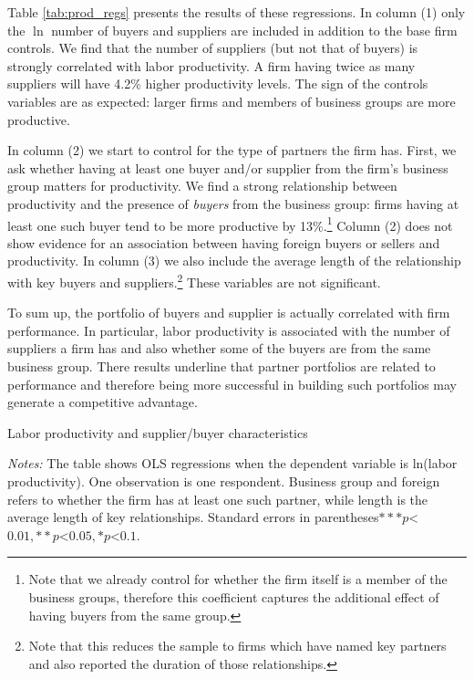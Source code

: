 \usepackage{}\documentclass[final, dvipsnames, authoryear,12pt]{elsarticle}
\begin{document}

Table \ref{tab:prod_regs} presents the results of these regressions. In column (1) only the $\ln$ number of buyers and suppliers are included in addition to the base firm controls. We find that the number of suppliers (but not that of buyers) is strongly correlated with labor productivity. A firm having twice as many suppliers will have 4.2\% higher productivity levels. The sign of the controls variables are as expected: larger firms and members of business groups are more productive.

In column (2) we start to control for the type of partners the firm has. First, we ask whether having at least one buyer and/or supplier from the firm's business group matters for productivity. We find a strong relationship between productivity and the presence of \textit{buyers} from the business group: firms having at least one such buyer tend to be more productive by 13\%.\footnote{Note that we already control for whether the firm itself is a member of the business groups, therefore this coefficient captures the additional effect of having buyers from the same group.} Column (2) does not show evidence for an association between having foreign buyers or sellers and productivity. In column (3) we also include the average length of the relationship with key buyers and suppliers.\footnote{Note that this reduces the sample to firms which have named key partners and also reported the duration of those relationships.} These variables are not significant.

To sum up, the portfolio of buyers and supplier is actually correlated with firm performance. In particular, labor productivity is associated with the number of suppliers a firm has and also whether some of the buyers are from the same business group. There results underline that partner portfolios are related to performance and therefore being more successful in building such portfolios may generate a competitive advantage.


\begin{table}[H]
    \caption{Labor productivity and supplier/buyer characteristics}
    \label{tab:prod_regs}
    \centerline{}

    {\scriptsize \textit{Notes:} The table shows OLS regressions when the dependent variable is ln(labor productivity). One observation is one respondent. Business group and foreign refers to whether the firm has at least one such partner, while length is the average length of key relationships. Standard errors in parentheses$ *** p$<$0.01, ** p$<$0.05, * p$<$0.1 $.}
\end{table}
    
\end{document}
